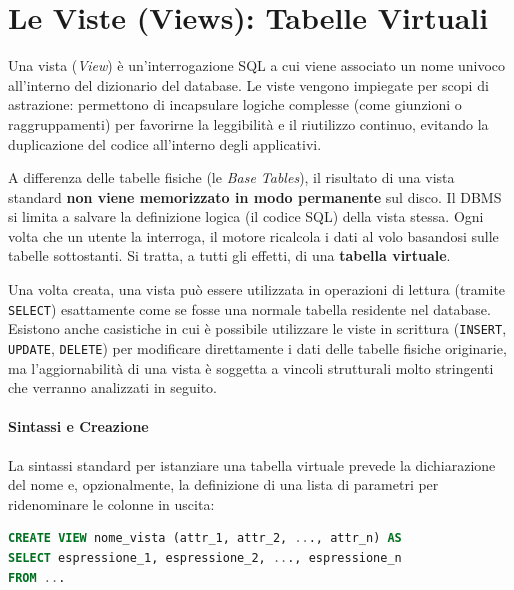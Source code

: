 \section{Le Viste (Views): Tabelle Virtuali}

Una vista (\textit{View}) è un'interrogazione SQL a cui viene associato un nome univoco all'interno del dizionario del database. Le viste vengono impiegate per scopi di astrazione: permettono di incapsulare logiche complesse (come giunzioni o raggruppamenti) per favorirne la leggibilità e il riutilizzo continuo, evitando la duplicazione del codice all'interno degli applicativi.

\begin{observation}
A differenza delle tabelle fisiche (le \textit{Base Tables}), il risultato di una vista standard \textbf{non viene memorizzato in modo permanente} sul disco. Il DBMS si limita a salvare la definizione logica (il codice SQL) della vista stessa. Ogni volta che un utente la interroga, il motore ricalcola i dati al volo basandosi sulle tabelle sottostanti. Si tratta, a tutti gli effetti, di una \textbf{tabella virtuale}.
\end{observation}

Una volta creata, una vista può essere utilizzata in operazioni di lettura (tramite \texttt{SELECT}) esattamente come se fosse una normale tabella residente nel database. Esistono anche casistiche in cui è possibile utilizzare le viste in scrittura (\texttt{INSERT}, \texttt{UPDATE}, \texttt{DELETE}) per modificare direttamente i dati delle tabelle fisiche originarie, ma l'aggiornabilità di una vista è soggetta a vincoli strutturali molto stringenti che verranno analizzati in seguito.

\paragraph{Sintassi e Creazione}

La sintassi standard per istanziare una tabella virtuale prevede la dichiarazione del nome e, opzionalmente, la definizione di una lista di parametri per ridenominare le colonne in uscita:

\begin{lstlisting}[language=SQL, basicstyle=\ttfamily\small, keywordstyle=\color{blue}\bfseries]
CREATE VIEW nome_vista (attr_1, attr_2, ..., attr_n) AS
SELECT espressione_1, espressione_2, ..., espressione_n
FROM ...
\end{lstlisting}

